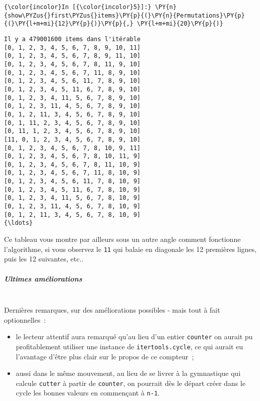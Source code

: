     \begin{Verbatim}[commandchars=\\\{\}]
{\color{incolor}In [{\color{incolor}5}]:} \PY{n}{show\PYZus{}first\PYZus{}items}\PY{p}{(}\PY{n}{Permutations}\PY{p}{(}\PY{l+m+mi}{12}\PY{p}{)}\PY{p}{,} \PY{l+m+mi}{20}\PY{p}{)}
\end{Verbatim}


    \begin{Verbatim}[commandchars=\\\{\}]
Il y a 479001600 items dans l'itérable
[0, 1, 2, 3, 4, 5, 6, 7, 8, 9, 10, 11]
[0, 1, 2, 3, 4, 5, 6, 7, 8, 9, 11, 10]
[0, 1, 2, 3, 4, 5, 6, 7, 8, 11, 9, 10]
[0, 1, 2, 3, 4, 5, 6, 7, 11, 8, 9, 10]
[0, 1, 2, 3, 4, 5, 6, 11, 7, 8, 9, 10]
[0, 1, 2, 3, 4, 5, 11, 6, 7, 8, 9, 10]
[0, 1, 2, 3, 4, 11, 5, 6, 7, 8, 9, 10]
[0, 1, 2, 3, 11, 4, 5, 6, 7, 8, 9, 10]
[0, 1, 2, 11, 3, 4, 5, 6, 7, 8, 9, 10]
[0, 1, 11, 2, 3, 4, 5, 6, 7, 8, 9, 10]
[0, 11, 1, 2, 3, 4, 5, 6, 7, 8, 9, 10]
[11, 0, 1, 2, 3, 4, 5, 6, 7, 8, 9, 10]
[0, 1, 2, 3, 4, 5, 6, 7, 8, 10, 9, 11]
[0, 1, 2, 3, 4, 5, 6, 7, 8, 10, 11, 9]
[0, 1, 2, 3, 4, 5, 6, 7, 8, 11, 10, 9]
[0, 1, 2, 3, 4, 5, 6, 7, 11, 8, 10, 9]
[0, 1, 2, 3, 4, 5, 6, 11, 7, 8, 10, 9]
[0, 1, 2, 3, 4, 5, 11, 6, 7, 8, 10, 9]
[0, 1, 2, 3, 4, 11, 5, 6, 7, 8, 10, 9]
[0, 1, 2, 3, 11, 4, 5, 6, 7, 8, 10, 9]
[0, 1, 2, 11, 3, 4, 5, 6, 7, 8, 10, 9]
{\ldots}

    \end{Verbatim}

    Ce tableau vous montre par ailleurs sous un autre angle comment
fonctionne l'algorithme, si vous observez le \texttt{11} qui balaie en
diagonale les 12 premières lignes, puis les 12 suivantes, etc..

    \hypertarget{ultimes-amuxe9liorations}{%
\subparagraph{Ultimes améliorations\\\\}\label{ultimes-amuxe9liorations}}

    Dernières remarques, sur des améliorations possibles - mais tout à fait
optionnelles~:

\begin{itemize}
\tightlist
\item
  le lecteur attentif aura remarqué qu'au lieu d'un entier
  \texttt{counter} on aurait pu profitablement utiliser une instance de
  \texttt{itertools.cycle}, ce qui aurait eu l'avantage d'être plus
  clair sur le propos de ce compteur~;
\item
  aussi dans le même mouvement, au lieu de se livrer à la gymnastique
  qui calcule \texttt{cutter} à partir de \texttt{counter}, on pourrait
  dès le départ créer dans le cycle les bonnes valeurs en commençant à
  \texttt{n-1}.
\end{itemize}

